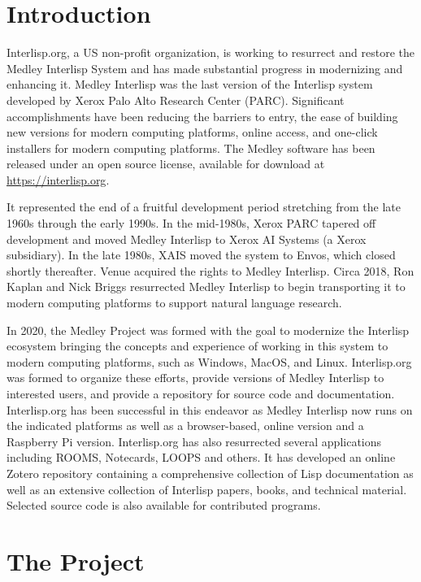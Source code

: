 \documentclass[sigconf]{acmart}
\begin{document}
\section{Introduction}
Interlisp.org, a US non-profit organization, is working to resurrect and restore the Medley Interlisp System and has made substantial progress in modernizing and enhancing it. Medley Interlisp was the last version of the Interlisp system developed by Xerox Palo Alto Research Center (PARC). Significant accomplishments have been reducing the barriers to entry, the ease of building new versions for modern computing platforms, online access, and one-click installers for modern computing platforms. The Medley software has been released under an open source license, available for download at \url{https://interlisp.org}.

It represented the end of a fruitful development period stretching from the late 1960s through the early 1990s. In the mid-1980s, Xerox PARC tapered off development and moved Medley Interlisp to Xerox AI Systems (a Xerox subsidiary). In the late 1980s, XAIS moved the system to Envos, which closed shortly thereafter. Venue acquired the rights to Medley Interlisp. Circa 2018, Ron Kaplan and Nick Briggs resurrected Medley Interlisp to begin transporting it to modern computing platforms to support natural language research.

In 2020, the Medley Project was formed with the goal to modernize the Interlisp ecosystem bringing the concepts and experience of working in this system to modern computing platforms, such as Windows, MacOS, and Linux. Interlisp.org was formed to organize these efforts, provide versions of Medley Interlisp to interested users, and provide a repository for source code and documentation. Interlisp.org has been successful in this endeavor as Medley Interlisp now runs on the indicated platforms as well as a browser-based, online version and a Raspberry Pi version. Interlisp.org has also resurrected several applications including ROOMS, Notecards, LOOPS and others. It has developed an online Zotero repository containing a comprehensive collection of Lisp documentation as well as an extensive collection of Interlisp papers, books, and technical material. Selected source code is also available for contributed programs.

\section{The Project}
\end{document}
